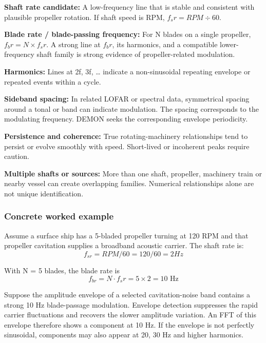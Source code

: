 \begin{compactitem}
    \item \textbf{Shaft rate candidate: }A low-frequency line that is stable and consistent with plausible propeller rotation. If shaft speed is RPM, $f_sr = RPM\div60$.
    \item \textbf{Blade rate / blade-passing frequency: }For N blades on a single propeller, $f_br = N \times f_sr$. A strong line at $f_br$, its harmonics, and a compatible lower-frequency shaft family is strong evidence of propeller-related modulation.
    \item \textbf{Harmonics: }Lines at 2f, 3f, … indicate a non-sinusoidal repeating envelope or repeated events within a cycle.
    \item \textbf{Sideband spacing: }In related LOFAR or spectral data, symmetrical spacing around a tonal or band can indicate modulation. The spacing corresponds to the modulating frequency. DEMON seeks the corresponding envelope periodicity.
    \item \textbf{Persistence and coherence: }True rotating-machinery relationships tend to persist or evolve smoothly with speed. Short-lived or incoherent peaks require caution.
    \item \textbf{Multiple shafts or sources: }More than one shaft, propeller, machinery train or nearby vessel can create overlapping families. Numerical relationships alone are not unique identification.
\end{compactitem}

\subsubsection{Concrete worked example}

Assume a surface ship has a 5-bladed propeller turning at 120 RPM and that propeller cavitation supplies a broadband acoustic carrier. The shaft rate is:
\[
    f_{sr} = RPM / 60 = 120 / 60 = 2 Hz
\]

With N = 5 blades, the blade rate is
\[
    f_{br} = N \cdot f_sr = 5 \times 2 = 10 \text{ Hz}
\]

Suppose the amplitude envelope of a selected cavitation-noise band contains a strong 10 Hz blade-passage modulation. Envelope detection suppresses the rapid carrier fluctuations and recovers the slower amplitude variation. An FFT of this envelope therefore shows a component at 10 Hz. If the envelope is not perfectly sinusoidal, components may also appear at 20, 30 Hz and higher harmonics.

